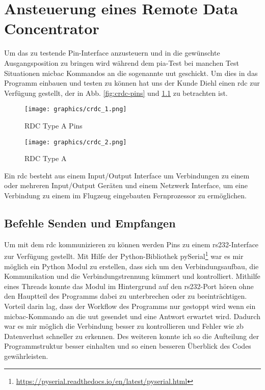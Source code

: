 \chapter{Ansteuerung eines Remote Data Concentrator}
\label{ch:micbac}

Um das zu testende Pin-Interface anzusteuern und in die gewünschte Ausgangsposition zu 
bringen wird während dem \ac{pia}-Test bei manchen Test Situationen \ac{micbac} Kommandos an die 
sogenannte \ac{uut} geschickt. Um dies in das Programm einbauen und testen zu können hat 
uns der Kunde Diehl einen \ac{rdc} zur Verfügung gestellt, der in Abb. 
\ref{fig:crdc-pins} und \ref{fig:crdc_top} zu betrachten ist.

\begin{figure}[H]
	\begin{minipage}{0.5\textwidth}
		\centering
		\texttt{[image: graphics/crdc\_1.png]}
		\caption{RDC Type A Pins}
		\label{fig:crdc-pins}
	\end{minipage}
	\begin{minipage}{0.5\textwidth}
		\centering
		\texttt{[image: graphics/crdc\_2.png]}
		\caption{RDC Type A}
		\label{fig:crdc_top}
	\end{minipage}
\end{figure}

Ein \ac{rdc} besteht aus einem Input/Output Interface um Verbindungen zu einem oder 
mehreren Input/Output Geräten und einem Netzwerk Interface, um eine Verbindung zu einem im
Flugzeug eingebauten Fernprozessor zu ermöglichen.


\section{Befehle Senden und Empfangen}
\label{sec:com-send-receive}

Um mit dem \ac{rdc} kommunizieren zu können werden Pins zu einem \ac{rs232}-Interface zur Verfügung gestellt. Mit Hilfe der Python-Bibliothek pySerial\footnote{\url{https://pyserial.readthedocs.io/en/latest/pyserial.html}} war es mir möglich ein Python Modul zu erstellen, dass sich um den Verbindungsaufbau, die Kommunikation und die Verbindungstrennung kümmert und kontrolliert. Mithilfe eines Threads konnte das Modul im Hintergrund auf den \ac{rs232}-Port hören ohne den Hauptteil des Programms dabei zu unterbrechen oder zu beeinträchtigen. Vorteil darin lag, dass der Workflow des Programms nur gestoppt wird wenn ein \ac{micbac}-Kommando an die \ac{uut} gesendet und eine Antwort erwartet wird. Dadurch war es mir möglich die Verbindung besser zu kontrollieren und Fehler wie \ac{zb} Datenverlust schneller zu erkennen. Des weiteren konnte ich so die Aufteilung der Programmstruktur besser einhalten und so einen besseren Überblick des Codes gewährleisten.

